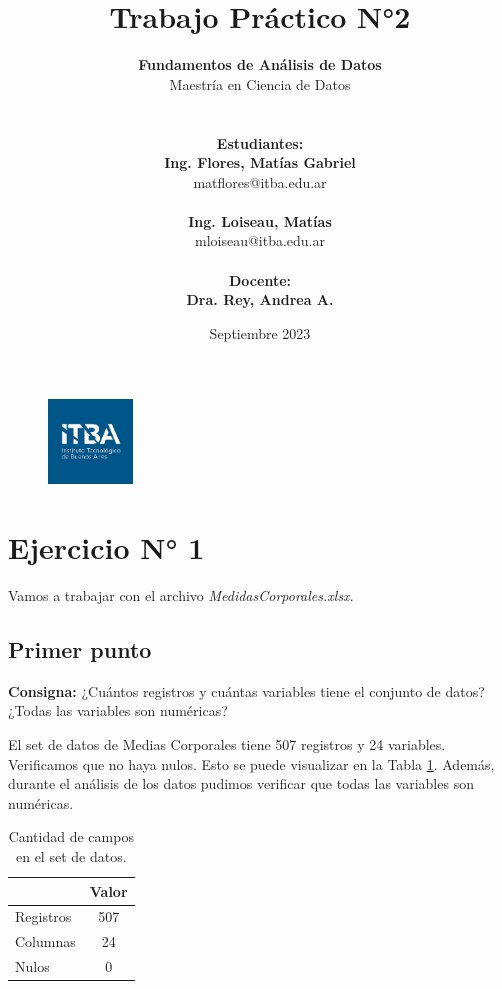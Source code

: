 \documentclass{article} %
\title{Trabajo Práctico N°2} %
\date{Septiembre 2023} %
\author{
	\textbf{Fundamentos de Análisis de Datos}\\
	Maestría en Ciencia de Datos\\
	\\~\\
	\textbf{Estudiantes: }\\
	\textbf{Ing. Flores, Matías Gabriel}\\
	matflores@itba.edu.ar
 	\\~\\
 	\textbf{Ing. Loiseau, Matías}\\
 	mloiseau@itba.edu.ar
 	\\~\\
	\textbf{Docente: }\\
	\textbf{Dra. Rey, Andrea A.}
}
\begin{document}

\begin{figure}
\centering
	\includegraphics[width=0.2\textwidth]{images/itba-logo}
	\label{fig:itba-logo}
\end{figure}
\maketitle %

\thispagestyle{empty} %
\cleardoublepage

\cleardoublepage
\tableofcontents %
\cleardoublepage


\section{Ejercicio N° 1}

Vamos a trabajar con el archivo \textit{MedidasCorporales.xlsx}.

\subsection{Primer punto}

\textbf{Consigna:} ¿Cuántos registros y cuántas variables tiene el conjunto de datos? ¿Todas las variables
son numéricas?

El set de datos de Medias Corporales tiene 507 registros y 24 variables. Verificamos que no haya nulos. Esto se puede visualizar en la Tabla \ref{tab:table-punto-1-1}. Además, durante el análisis de los datos pudimos verificar que todas las variables son numéricas.

\begin{table}[H]
	\centering
		\begin{tabular}{||l | c ||}
			\hline
			\hline
			 & Valor\\
			\hline			
			\hline
			Registros & 507\\
			\hline
			Columnas & 24\\
			\hline
			Nulos & 0 \\
			\hline
			\hline
		\end{tabular}
		\caption{Cantidad de campos en el set de datos.}
	\label{tab:table-punto-1-1}
\end{table}
\end{document}
